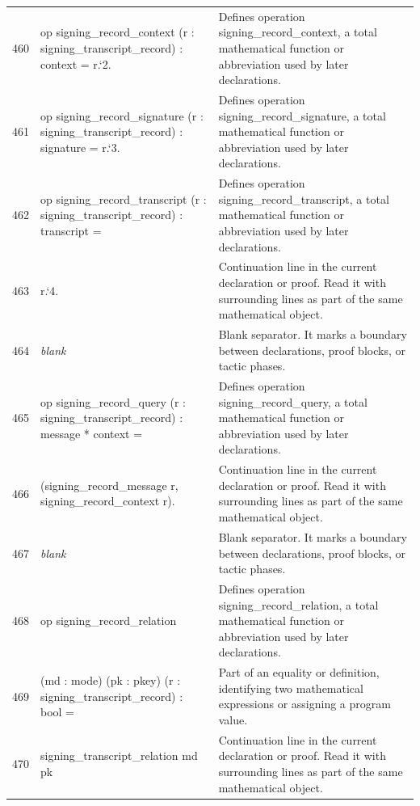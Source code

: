 \documentclass[10pt]{article}
\begin{document}
\begin{longtable}{r L{0.53\textwidth} L{0.37\textwidth}}
460 & {\ttfamily\scriptsize op signing\_record\_context (r : signing\_transcript\_record) : context = r.`2.} & Defines operation signing\_record\_context, a total mathematical function or abbreviation used by later declarations. \\
461 & {\ttfamily\scriptsize op signing\_record\_signature (r : signing\_transcript\_record) : signature = r.`3.} & Defines operation signing\_record\_signature, a total mathematical function or abbreviation used by later declarations. \\
462 & {\ttfamily\scriptsize op signing\_record\_transcript (r : signing\_transcript\_record) : transcript =} & Defines operation signing\_record\_transcript, a total mathematical function or abbreviation used by later declarations. \\
463 & {\ttfamily\scriptsize   r.`4.} & Continuation line in the current declaration or proof.  Read it with surrounding lines as part of the same mathematical object. \\
464 & {\ttfamily\scriptsize \emph{blank}} & Blank separator.  It marks a boundary between declarations, proof blocks, or tactic phases. \\
465 & {\ttfamily\scriptsize op signing\_record\_query (r : signing\_transcript\_record) : message * context =} & Defines operation signing\_record\_query, a total mathematical function or abbreviation used by later declarations. \\
466 & {\ttfamily\scriptsize   (signing\_record\_message r, signing\_record\_context r).} & Continuation line in the current declaration or proof.  Read it with surrounding lines as part of the same mathematical object. \\
467 & {\ttfamily\scriptsize \emph{blank}} & Blank separator.  It marks a boundary between declarations, proof blocks, or tactic phases. \\
468 & {\ttfamily\scriptsize op signing\_record\_relation} & Defines operation signing\_record\_relation, a total mathematical function or abbreviation used by later declarations. \\
469 & {\ttfamily\scriptsize    (md : mode) (pk : pkey) (r : signing\_transcript\_record) : bool =} & Part of an equality or definition, identifying two mathematical expressions or assigning a program value. \\
470 & {\ttfamily\scriptsize   signing\_transcript\_relation md pk} & Continuation line in the current declaration or proof.  Read it with surrounding lines as part of the same mathematical object. \\

\end{longtable}
\end{document}
